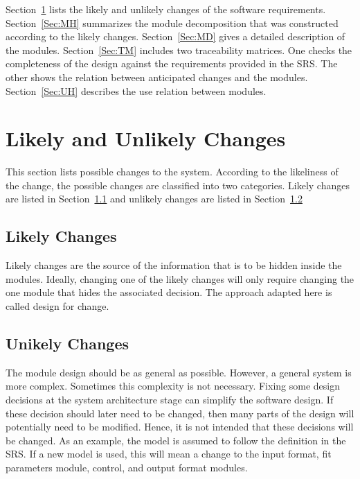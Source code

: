 \documentclass[12pt]{article}
\begin{document}
Section~\ref{Sec:LaUC}  lists the likely and unlikely changes of the software requirements. Section~\ref{Sec:MH}  summarizes the module decomposition that was constructed according to the likely changes. Section~\ref{Sec:MD}  gives a detailed description of the modules. Section~\ref{Sec:TM}  includes two traceability matrices. One checks the completeness of the design against the requirements provided in the SRS. The other shows the relation between anticipated changes and the modules. Section~\ref{Sec:UH}  describes the use relation between modules.
\section{Likely and Unlikely Changes}
\label{Sec:LaUC}
This section lists possible changes to the system. According to the likeliness of the change, the possible changes are classified into two categories. Likely changes are listed in Section~\ref{Sec:LC} and unlikely changes are listed in Section~\ref{Sec:UC}
\subsection{Likely Changes}
\label{Sec:LC}
Likely changes are the source of the information that is to be hidden inside the modules. Ideally, changing one of the likely changes will only require changing the one module that hides the associated decision. The approach adapted here is called design for change.
\subsection{Unikely Changes}
\label{Sec:UC}
The module design should be as general as possible. However, a general system is more complex. Sometimes this complexity is not necessary. Fixing some design decisions at the system architecture stage can simplify the software design. If these decision should later need to be changed, then many parts of the design will potentially need to be modified. Hence, it is not intended that these decisions will be changed.  As an example, the model is assumed to follow the definition in the SRS.  If a new model is used, this will mean a change to the input format, fit parameters module, control, and output format modules.
\end{document}
